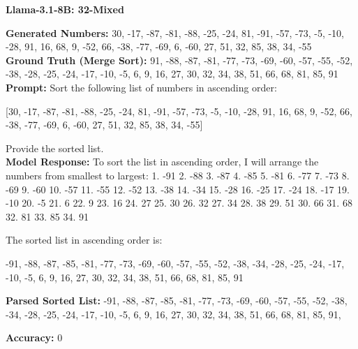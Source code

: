 \begin{figure*}
\begin{AIbox}{\bf{\large Llama-3.1-8B: 32-Mixed}}
\vspace{0.5cm}

\textbf{Generated Numbers:} 30, -17, -87, -81, -88, -25, -24, 81, -91, -57, -73, -5, -10, -28, 91, 16, 68, 9, -52, 66, -38, -77, -69, 6, -60, 27, 51, 32, 85, 38, 34, -55
\\

\textbf{Ground Truth (Merge Sort):} 91, -88, -87, -81, -77, -73, -69, -60, -57, -55, -52, -38, -28, -25, -24, -17, -10, -5, 6, 9, 16, 27, 30, 32, 34, 38, 51, 66, 68, 81, 85, 91
\\

\textbf{Prompt:}
Sort the following list of numbers in ascending order:

[30, -17, -87, -81, -88, -25, -24, 81, -91, -57, -73, -5, -10, -28, 91, 16, 68, 9, -52, 66, -38, -77, -69, 6, -60, 27, 51, 32, 85, 38, 34, -55]

Provide the sorted list.
\\

\textbf{Model Response:}
To sort the list in ascending order, I will arrange the numbers from smallest to largest: 1. -91 2. -88 3. -87 4. -85 5. -81 6. -77 7. -73 8. -69 9. -60 10. -57 11. -55 12. -52 13. -38 14. -34 15. -28 16. -25 17. -24 18. -17 19. -10 20. -5 21. 6 22. 9 23. 16 24. 27 25. 30 26. 32 27. 34 28. 38 29. 51 30. 66 31. 68 32. 81 33. 85 34. 91

The sorted list in ascending order is:

-91, -88, -87, -85, -81, -77, -73, -69, -60, -57, -55, -52, -38, -34, -28, -25, -24, -17, -10, -5, 6, 9, 16, 27, 30, 32, 34, 38, 51, 66, 68, 81, 85, 91

\textbf{Parsed Sorted List:}
-91, -88, -87, -85, -81, -77, -73, -69, -60, -57, -55, -52, -38, -34, -28, -25, -24, -17, -10, -5, 6, 9, 16, 27, 30, 32, 34, 38, 51, 66, 68, 81, 85, 91,

\textbf{Accuracy:} 0


\end{AIbox}
\caption{Incorrect Sorting Example: Model sometimes include extra numbers (-91 and -85 here).}
\end{figure*}




